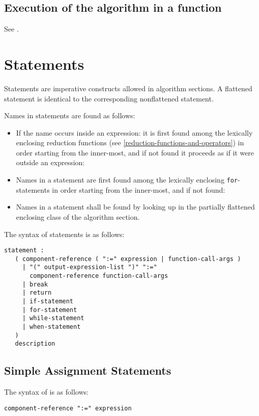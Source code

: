 \subsection{Execution of the algorithm in a function}\label{execution-of-the-algorithm-in-a-function}

See .

\section{Statements}\label{statements}

Statements are imperative constructs allowed in algorithm sections. A
flattened statement is identical to the corresponding nonflattened
statement.

Names in statements are found as follows:
\begin{itemize}
\item
  If the name occurs inside an expression: it is first found among the
  lexically enclosing reduction functions (see \cref{reduction-functions-and-operators}) in order
  starting from the inner-most, and if not found it proceeds as if it
  were outside an expression:
\item
  Names in a statement are first found among the lexically enclosing \lstinline!for!-statements in order starting from the inner-most, and if not found:
\item
  Names in a statement shall be found by looking up in the partially
  flattened enclosing class of the algorithm section.
\end{itemize}

The syntax of statements is as follows:
\begin{lstlisting}[language=grammar]
statement :
   ( component-reference ( ":=" expression | function-call-args )
     | "(" output-expression-list ")" ":="
       component-reference function-call-args
     | break
     | return
     | if-statement
     | for-statement
     | while-statement
     | when-statement
   )
   description
\end{lstlisting}

\subsection{Simple Assignment Statements}\label{simple-assignment-statements}

The syntax of  is as follows:
\begin{lstlisting}[language=grammar]
component-reference ":=" expression
\end{lstlisting}

